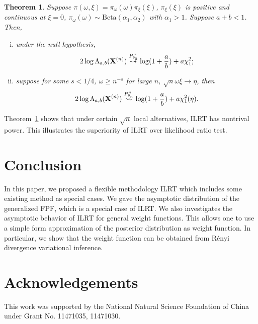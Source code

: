 \documentclass[11pt]{article}
\theoremstyle{plain}
\newtheorem{theorem}{\quad\quad Theorem}
\theoremstyle{definition}
\theoremstyle{remark}
\begin{document}
\begin{theorem}
    Suppose $\pi(\omega,\xi)=\pi_{\omega}(\omega) \pi_{\xi}(\xi)$, $\pi_\xi(\xi)$ is positive and continuous at $\xi=0$,
    $\pi_\omega(\omega)\sim \text{Beta}(\alpha_1,\alpha_2)$ with $\alpha_1>1$.
    Suppose $a+b<1$.
    Then,
    \begin{enumerate}[(i)]
        \item
    under the null hypothesis,
    \begin{equation*}
        2\log \Lambda_{a,b} (\mathbf{X}^{(n)})\overset{P^n_{\theta_0}}{\rightsquigarrow}\log(1+\frac a b)+ a\chi^2_{1};
    \end{equation*}
\item
    suppose for some $s<1/4$, $\omega \geq n^{-s}$ for large $n$, $\sqrt{n}\omega \xi \to \eta$, then
    \begin{equation*}
        2\log \Lambda_{a,b} (\mathbf{X}^{(n)})\overset{P^n_{\theta_n}}{\rightsquigarrow}\log(1+\frac a b)+ a\chi^2_{1}(\eta).
    \end{equation*}
\end{enumerate}
    \label{mixtureThm}
\end{theorem}
Theorem~\ref{mixtureThm} shows that under certain $\sqrt{n}$ local alternatives, ILRT has nontrival power. 
This illustrates the superiority of ILRT over likelihood ratio test.






\section{Conclusion}
In this paper, we proposed a flexible methodology ILRT which includes some existing method as special cases.
We gave the asymptotic distribution of the generalized FPF, which is a special case of ILRT.
We also investigates the asymptotic behavior of ILRT for general weight functions.
This allows one to use a simple form approximation of the posterior distribution as weight function.
In particular, we show that the weight function can be obtained from R\'{e}nyi divergence variational inference.

\section*{Acknowledgements}
This work was supported by the National Natural Science Foundation of China under Grant No. 11471035, 11471030.
\end{document}
